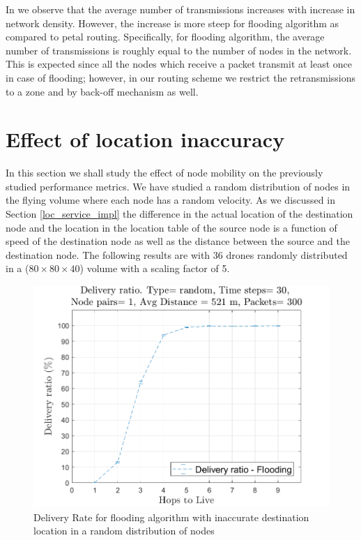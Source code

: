 In  we observe that the average number of transmissions increases with increase in network density. However, the increase is more steep for flooding algorithm as compared to petal routing. Specifically, for flooding algorithm, the average number of transmissions is roughly equal to the number of nodes in the network. This is expected since all the nodes which receive a packet transmit at least once in case of flooding; however, in our routing scheme we restrict the retransmissions to a zone and by back-off mechanism as well.

\section{Effect of location inaccuracy}

In this section we shall study the effect of node mobility on the previously studied performance metrics. We have studied a random distribution of nodes in the flying volume where each node has a random velocity. As we discussed in Section \ref{loc_service_impl} the difference in the actual location of the destination node and the location in the location table of the source node is a function of speed of the destination node as well as the distance between the source and the destination node. The following results are with 36 drones randomly distributed in a ($80 \times 80 \times 40$) volume with a scaling factor of 5. 

\begin{figure}[hbtp]
\centering
\includegraphics[width=\simResultFigSize\textwidth]{ncsuthesis-0.6/Chapter-5/figs/mob_fl_DR_random.png}
\caption{Delivery Rate for flooding algorithm with inaccurate destination location in a random distribution of nodes}
\label{fig:mob_fl_DR_random}
\end{figure}

